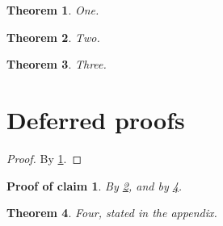\documentclass{article}
\newtheorem{theorem}{Theorem}
\newtheorem{claimproof}{Proof of claim}
\begin{document}
\begin{theorem}\label{t1}One.\end{theorem}
\begin{theorem}\label{t2}Two.\end{theorem}
\begin{theorem}\label{t3}Three.\end{theorem}

\appendix
\section{Deferred proofs}

\begin{proof}
  By \ref{t1}.
\end{proof}

\begin{claimproof}
  By \ref{t2}, and by \ref{t4}.
\end{claimproof}

\begin{theorem}\label{t4}Four, stated in the appendix.\end{theorem}
\end{document}
